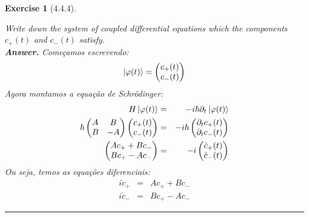 \documentclass[12pt]{article}
\def\be{\begin{equation}}
\def\ee{\end{equation}}
\def\bea{\begin{eqnarray*}}
\def\eea{\end{eqnarray*}}
\def\beaa{\begin{eqnarray}}
\def\eeaa{\end{eqnarray}}
\newtheorem{exercise}{Exercise}
\newenvironment{multianswer}{\\ \noindent\textbf{\textit{Answer.}} \normalfont }{ \par\noindent\rule{0.7\textwidth}{0.1pt}}
\begin{document}
\begin{exercise}[4.4.4]
\begin{exercises}
		Write down the system of coupled differential equations which the components $c_{+}(t)$ and $c_{-}(t)$ satisfy.
		\begin{multianswer}
				Começamos escrevendo:
				\be
					\ket{\varphi(t)} = \begin{pmatrix}
						c_+(t) \\ c_-(t)
						\end{pmatrix}
				\ee
				Agora montamos a equação de Schrödinger:
				\bea
					H\ket{\varphi(t)} &=& -i\hbar \partial_t\ket{\varphi(t)} \\
					\hbar\begin{pmatrix}
						A & B \\
						B & -A
					\end{pmatrix} 
					\begin{pmatrix}
						c_+(t) \\ c_-(t)
					\end{pmatrix} 
					&=& 
					-i\hbar 
					\begin{pmatrix}
						\partial_t c_+(t) \\ \partial_t c_-(t)
					\end{pmatrix} \\
					\begin{pmatrix}
						Ac_+ + Bc_- \\ Bc_+ - Ac_-
					\end{pmatrix}
					&=&
					-i \begin{pmatrix}
						\dot{c}_+(t) \\ \dot{c}_-(t)
					\end{pmatrix}
				\eea
			Ou seja, temos as equações diferenciais:
			\beaa
				i\dot{c}_+ &=& Ac_+ + Bc_- \\
				i\dot{c}_- &=& Bc_+ - Ac_-
			\eeaa				
		\end{multianswer}
		

\end{exercises}
\end{exercise}
\end{document}
